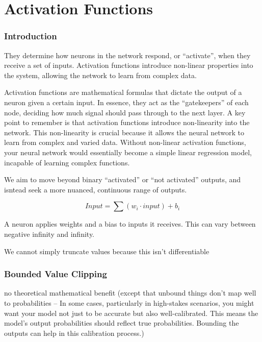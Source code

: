 \documentclass[11pt]{article}
\begin{document}


\tableofcontents

\clearpage

\section{Activation Functions}

\subsubsection{Introduction}

They determine how neurons in the network respond, or ``activate'', when they receive a set of inputs. Activation functions introduce non-linear properties into the system, allowing the network to learn from complex data.

Activation functions are mathematical formulas that dictate the output of a neuron given a certain input. In essence, they act as the ``gatekeepers'' of each node, deciding how much signal should pass through to the next layer. A key point to remember is that activation functions introduce non-linearity into the network. This non-linearity is crucial because it allows the neural network to learn from complex and varied data. Without non-linear activation functions, your neural network would essentially become a simple linear regression model, incapable of learning complex functions.

We aim to move beyond binary ``activated'' or ``not activated'' outputs, and isntead seek a more nuanced, continuous range of outputs. 

\begin{equation*}
    Input = \sum(w_i \cdot input) + b_i
\end{equation*}

A neuron applies weights and a bias to inputs it receives. This can vary between negative infinity and infinity. 

We cannot simply truncate values because this isn't differentiable 

\subsubsection{Bounded Value Clipping}

no theoretical mathematical benefit (except that unbound things don't map well to probabilities -- In some cases, particularly in high-stakes scenarios, you might want your model not just to be accurate but also well-calibrated. This means the model's output probabilities should reflect true probabilities. Bounding the outputs can help in this calibration process.)
\end{document}
